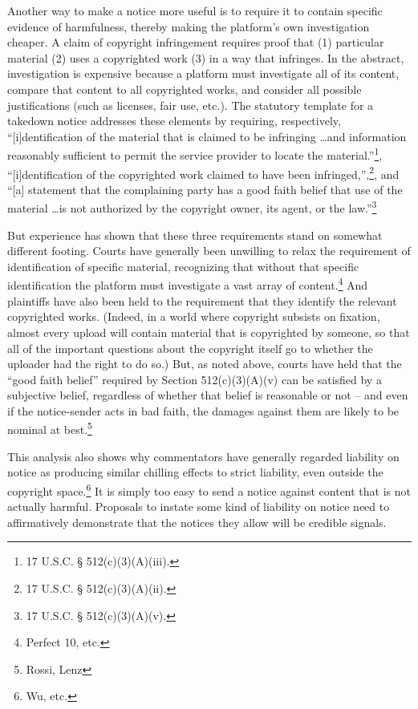 Another way to make a notice more useful is to require it to contain specific evidence of harmfulness, thereby making the platform's own investigation cheaper. A claim of copyright infringement requires proof that (1) particular material (2) uses a copyrighted work (3) in a way that infringes. In the abstract, investigation is expensive because a platform must investigate all of its content, compare that content to all copyrighted works, and consider all possible justifications (such as licenses, fair use, etc.).  The statutory template for a takedown notice addresses these elements by requiring, respectively, ``[i]dentification of the material that is claimed to be infringing \ldots and information reasonably sufficient to permit the service provider to locate the material.''\footnote{17 U.S.C. § 512(c)(3)(A)(iii).}, ``[i]dentification of the copyrighted work claimed to have been infringed,'',\footnote{17 U.S.C. § 512(c)(3)(A)(ii).}, and ``[a] statement that the complaining party has a good faith belief that use of the material \ldots  is not authorized by the copyright owner, its agent, or the law.''\footnote{17 U.S.C. § 512(c)(3)(A)(v).}

But experience has shown that these three requirements stand on somewhat different footing. Courts have generally been unwilling to relax the requirement of identification of specific material, recognizing that without that specific identification the platform must investigate a vast array of content.\footnote{Perfect 10, etc.} And plaintiffs have also been held to the requirement that they identify the relevant copyrighted works. (Indeed, in a world where copyright subsists on fixation, almost every upload will contain material that is copyrighted by someone, so that all of the important questions about the copyright itself go to whether the uploader had the right to do so.) But, as noted above, courts have held that the ``good faith belief'' required by Section 512(c)(3)(A)(v) can be satisfied by a subjective belief, regardless of whether that belief is reasonable or not -- and even if the notice-sender acts in bad faith, the damages against them are likely to be nominal at best.\footnote{Rossi, Lenz} 

This analysis also shows why commentators have generally regarded liability on notice as producing similar chilling effects to strict liability, even outside the copyright space.\footnote{Wu, etc.} It is simply too easy to send a notice against content that is not actually harmful. Proposals to instate some kind of liability on notice need to affirmatively demonstrate that the notices they allow will be credible signals.


